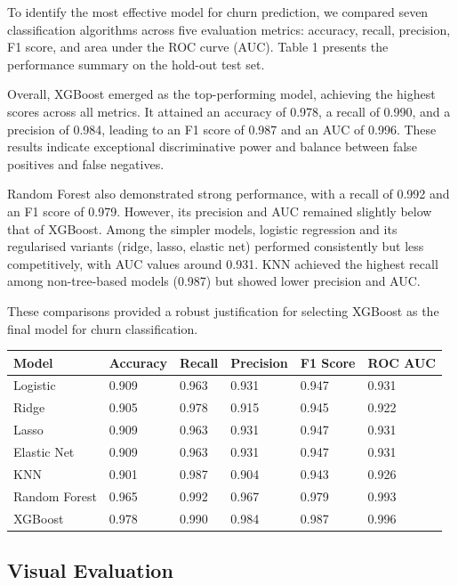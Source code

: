 \documentclass[
  letterpaper,
  DIV=11,
  numbers=noendperiod]{scrartcl}
\begin{document}
To identify the most effective model for churn prediction, we compared
seven classification algorithms across five evaluation metrics:
accuracy, recall, precision, F1 score, and area under the ROC curve
(AUC). Table 1 presents the performance summary on the hold-out test
set.

Overall, XGBoost emerged as the top-performing model, achieving the
highest scores across all metrics. It attained an accuracy of 0.978, a
recall of 0.990, and a precision of 0.984, leading to an F1 score of
0.987 and an AUC of 0.996. These results indicate exceptional
discriminative power and balance between false positives and false
negatives.

Random Forest also demonstrated strong performance, with a recall of
0.992 and an F1 score of 0.979. However, its precision and AUC remained
slightly below that of XGBoost. Among the simpler models, logistic
regression and its regularised variants (ridge, lasso, elastic net)
performed consistently but less competitively, with AUC values around
0.931. KNN achieved the highest recall among non-tree-based models
(0.987) but showed lower precision and AUC.

These comparisons provided a robust justification for selecting XGBoost
as the final model for churn classification.

\begin{longtable}[]{@{}llllll@{}}
\toprule\noalign{}
Model & Accuracy & Recall & Precision & F1 Score & ROC AUC \\
\midrule\noalign{}
\endhead
\bottomrule\noalign{}
\endlastfoot
Logistic & 0.909 & 0.963 & 0.931 & 0.947 & 0.931 \\
Ridge & 0.905 & 0.978 & 0.915 & 0.945 & 0.922 \\
Lasso & 0.909 & 0.963 & 0.931 & 0.947 & 0.931 \\
Elastic Net & 0.909 & 0.963 & 0.931 & 0.947 & 0.931 \\
KNN & 0.901 & 0.987 & 0.904 & 0.943 & 0.926 \\
Random Forest & 0.965 & 0.992 & 0.967 & 0.979 & 0.993 \\
XGBoost & 0.978 & 0.990 & 0.984 & 0.987 & 0.996 \\
\end{longtable}

\subsection{Visual Evaluation}\label{visual-evaluation}
\end{document}
